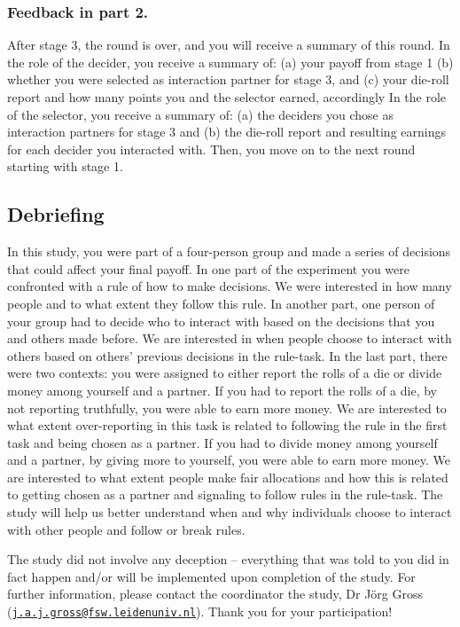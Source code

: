 \documentclass[
  man]{apa6}
\begin{document}
\hypertarget{feedback-in-part-2.}{%
\subsubsection{Feedback in part 2.}\label{feedback-in-part-2.}}

After stage 3, the round is over, and you will receive a summary of this round. In the role of the decider, you receive a summary of: (a) your payoff from stage 1 (b) whether you were selected as interaction partner for stage 3, and (c) your die-roll report and how many points you and the selector earned, accordingly In the role of the selector, you receive a summary of: (a) the deciders you chose as interaction partners for stage 3 and (b) the die-roll report and resulting earnings for each decider you interacted with. Then, you move on to the next round starting with stage 1.

\hypertarget{debriefing-1}{%
\subsection{Debriefing}\label{debriefing-1}}

In this study, you were part of a four-person group and made a series of decisions that could affect your final payoff. In one part of the experiment you were confronted with a rule of how to make decisions. We were interested in how many people and to what extent they follow this rule. In another part, one person of your group had to decide who to interact with based on the decisions that you and others made before. We are interested in when people choose to interact with others based on others' previous decisions in the rule-task. In the last part, there were two contexts: you were assigned to either report the rolls of a die or divide money among yourself and a partner. If you had to report the rolls of a die, by not reporting truthfully, you were able to earn more money. We are interested to what extent over-reporting in this task is related to following the rule in the first task and being chosen as a partner. If you had to divide money among yourself and a partner, by giving more to yourself, you were able to earn more money. We are interested to what extent people make fair allocations and how this is related to getting chosen as a partner and signaling to follow rules in the rule-task. The study will help us better understand when and why individuals choose to interact with other people and follow or break rules.

The study did not involve any deception -- everything that was told to you did in fact happen and/or will be implemented upon completion of the study. For further information, please contact the coordinator the study, Dr Jörg Gross (\href{mailto:j.a.j.gross@fsw.leidenuniv.nl}{\nolinkurl{j.a.j.gross@fsw.leidenuniv.nl}}). Thank you for your participation!
\end{document}
